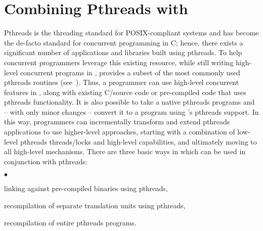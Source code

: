 \documentclass[openright,twoside]{report}
\begin{document}
\section{\texorpdfstring{Combining Pthreads with \uC}{Combining Pthreads with uC++}}

Pthreads is the threading standard for POSIX-compliant systems and has become the de-facto standard for concurrent programming in C;
hence, there exists a significant number of applications and libraries built using pthreads.
To help concurrent programmers leverage this existing resource, while still writing high-level concurrent programs in \CC, \uC provides a subset of the most commonly used pthreads routines (see~).
Thus, a \uC programmer can use high-level concurrent features in \uC, along with existing C/\CC source code or pre-compiled code that uses pthreads functionality.
It is also possible to take a native pthreads programs and --  with only minor changes --  convert it to a \uC program using \uC's pthreads support.
In this way, programmers can incrementally transform and extend pthreads applications to use higher-level \CC approaches, starting with a combination of low-level pthreads threads/locks and high-level \uC capabilities, and ultimately moving to all high-level mechanisms. 
There are three basic ways in which \uC can be used in conjunction with pthreads:
\begin{list}{$\bullet$}{\topsep=4pt\parsep=0pt\itemsep=0pt}
\item linking against pre-compiled binaries using pthreads,
\item recompilation of separate translation units using pthreads,
\item recompilation of entire pthreads programs.
\end{list}
\end{document}
